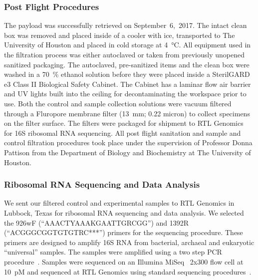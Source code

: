\subsubsection{Post Flight Procedures}


The payload was successfully retrieved on September~6,~2017. The intact clean box was removed and placed inside of a cooler with ice, transported to The University of Houston and placed in cold storage at \SI{4}{\celsius}. All equipment used in the filtration process was either autoclaved or taken from previously unopened sanitized packaging. The autoclaved, pre-sanitized items and the clean box were washed in a \SI{70}{\percent} ethanol solution before they were placed inside a SterilGARD e3 Class II Biological Safety Cabinet. The Cabinet has a laminar flow air barrier and UV lights built into the ceiling for decontaminating the workspace prior to use. Both the control and sample collection solutions were vacuum filtered through a Fluropore membrane filter (\SI{13}{\milli\meter}; \num{0.22} micron) to collect specimens on the filter surface.  The filters were packaged for shipment to RTL Genomics~\cite{RTL} for 16S ribosomal RNA sequencing. All post flight sanitation and sample and control filtration procedures took place under the supervision of Professor Donna Pattison from the Department of Biology and Biochemistry at The University of Houston.


\subsubsection{Ribosomal RNA Sequencing and Data Analysis}



We sent our filtered control and experimental samples to RTL Genomics in Lubbock, Texas for ribosomal RNA sequencing and data analysis. We selected the 926wF  (``AAACTYAAAKGAATTGRCGG'') and 1392R (``ACGGGCGGTGTGTRC***'') primers for the sequencing procedure. These primers are designed to amplify 16S RNA from bacterial, archaeal and eukaryotic ``universal'' samples. The samples were amplified using a two step PCR procedure~\cite{lemon}. Samples were sequenced on an Illumina MiSeq~\cite{illumina} 2x300 flow cell at 10~pM and sequenced at RTL Genomics using standard sequencing procedures~\cite{Microbial rRNA sequencing}.

